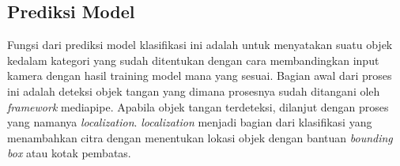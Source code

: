 
\subsection{Prediksi Model}
\label{subsec:Prediksi Model}

Fungsi dari prediksi model klasifikasi ini adalah untuk menyatakan suatu objek kedalam kategori yang sudah ditentukan dengan cara membandingkan input kamera dengan hasil training model mana yang sesuai. Bagian awal dari proses ini adalah deteksi objek tangan yang dimana prosesnya sudah ditangani oleh \emph{framework} mediapipe. Apabila objek tangan terdeteksi, dilanjut dengan proses yang namanya \emph{localization}. \emph{localization} menjadi bagian dari klasifikasi yang menambahkan citra dengan menentukan lokasi objek dengan bantuan \emph{bounding box} atau kotak pembatas. 

